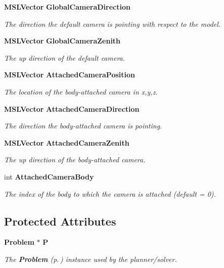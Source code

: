 \begin{CompactItemize}
{\bf MSLVector} {\bf Global\-Camera\-Direction}
\begin{CompactList}\small\item\em The direction the default camera is pointing with respect to the model.\item\end{CompactList}\item 
{\bf MSLVector} {\bf Global\-Camera\-Zenith}
\begin{CompactList}\small\item\em The up direction of the default camera.\item\end{CompactList}\item 
{\bf MSLVector} {\bf Attached\-Camera\-Position}
\begin{CompactList}\small\item\em The location of the body-attached camera in x,y,z.\item\end{CompactList}\item 
{\bf MSLVector} {\bf Attached\-Camera\-Direction}
\begin{CompactList}\small\item\em The direction the body-attached camera is pointing.\item\end{CompactList}\item 
{\bf MSLVector} {\bf Attached\-Camera\-Zenith}
\begin{CompactList}\small\item\em The up direction of the body-attached camera.\item\end{CompactList}\item 
int {\bf Attached\-Camera\-Body}
\begin{CompactList}\small\item\em The index of the body to which the camera is attached (default = 0).\item\end{CompactList}\end{CompactItemize}
\subsection*{Protected Attributes}
\begin{CompactItemize}
\item 
{\bf Problem} $\ast$ {\bf P}
\begin{CompactList}\small\item\em The {\bf Problem} {\rm (p.\,\pageref{classProblem})} instance used by the planner/solver.\item\end{CompactList}\end{CompactItemize}


